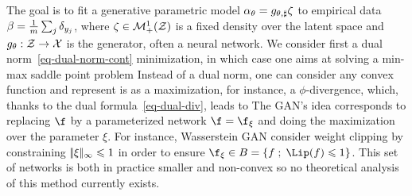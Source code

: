 The goal is to fit a generative parametric model $\alpha_\theta = g_{\theta,\sharp} \zeta$ to empirical data $\beta = \frac{1}{m}\sum_{j} \delta_{y_j}$, where $\zeta \in \mathcal{M}_+^1(\mathcal{Z})$ is a fixed density over the latent space and $g_\theta : \mathcal{Z} \rightarrow \mathcal{X}$ is the generator, often a neural network. We consider first a dual norm~\eqref{eq-dual-norm-cont} minimization, in which case one aims at solving a min-max saddle point problem
Instead of a dual norm, one can consider any convex function and represent is as a maximization,  for instance, a $\phi$-divergence, which, thanks to the dual formula~\eqref{eq-dual-div}, leads to
The GAN's idea corresponds to replacing $\f$ by a parameterized network $\f=\f_\xi$ and doing the maximization over the parameter $\xi$. For instance, Wasserstein GAN consider weight clipping by constraining $|\!| \xi |\!|_\infty \leqslant 1$ in order to ensure $\f_\xi \in B = \enscond{f}{\Lip(f) \leq 1}$. This set of networks is both in practice smaller and non-convex so no theoretical analysis of this method currently exists.